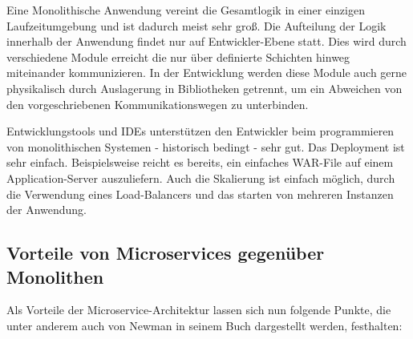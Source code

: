 \documentclass[12pt,a4paper,bibliography=totocnumbered,listof=totocnumbered]{scrartcl}
\begin{document}
Eine Monolithische Anwendung vereint die Gesamtlogik in einer einzigen Laufzeitumgebung und ist dadurch meist sehr groß. Die Aufteilung der Logik innerhalb der Anwendung findet nur auf Entwickler-Ebene statt. Dies wird durch verschiedene Module erreicht die nur über definierte Schichten hinweg miteinander kommunizieren. In der Entwicklung werden diese Module auch gerne physikalisch durch Auslagerung in Bibliotheken getrennt, um ein Abweichen von den vorgeschriebenen Kommunikationswegen zu unterbinden.

Entwicklungstools und IDEs unterstützen den Entwickler beim programmieren von monolithischen Systemen - historisch bedingt - sehr gut.
Das Deployment ist sehr einfach. Beispielsweise reicht es bereits, ein einfaches WAR-File auf einem Application-Server auszuliefern.
Auch die Skalierung ist einfach möglich, durch die Verwendung eines Load-Balancers und das starten von mehreren Instanzen der Anwendung.\cite{richardson}

\subsection{Vorteile von Microservices gegenüber Monolithen}\label{ch:ms-mon-pro}

Als Vorteile der Microservice-Architektur lassen sich nun folgende Punkte, die unter anderem auch von Newman in seinem Buch dargestellt werden, festhalten\cite{buildingms}:
\end{document}
